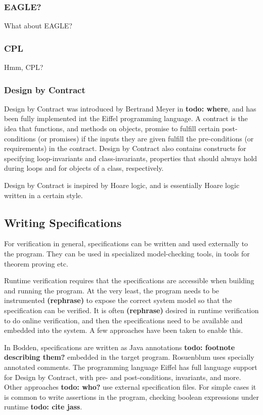 \documentclass[a4paper,11pt]{kth-mag}
\newcommand{\todo}[1]{\textbf{todo: #1}}
\newcommand{\rephrase}{\textbf{(rephrase)} }
\begin{document}
\subsubsection{EAGLE?}

What about EAGLE?

\subsubsection{CPL}

Hmm, CPL?



\subsubsection{Design by Contract}

Design by Contract was introduced by Bertrand Meyer in \todo{where}, and has
been fully implemented int the Eiffel programming language. A contract is the
idea that functions, and methods on objects, promise to fulfill certain
post-conditions (or promises) if the inputs they are given fulfill the
pre-conditions (or requirements) in the contract. Design by Contract also
contains constructs for specifying loop-invariants and class-invariants,
properties that should always hold during loops and for objects of a class,
respectively.

Design by Contract is inspired by Hoare logic, and is essentially Hoare logic
written in a certain style.

\subsection{Writing Specifications}

For verification in general, specifications can be written and used externally
to the program. They can be used in specialized model-checking tools, in tools
for theorem proving etc.

Runtime verification requires that the specifications are accessible when
building and running the program. At the very least, the program needs to be
instrumented \rephrase to expose the correct system model so that the
specification can be verified. It is often \rephrase desired in runtime
verification to do online verification, and then the specifications need to be
available and embedded into the system. A few approaches have been taken to
enable this.

In Bodden, specifications are written as Java annotations \todo{footnote
describing them?} embedded in the target program. Rosuenblum
\cite{rosenblum95practicalassertions} uses specially annotated comments. The
programming language Eiffel has full language support for Design by Contract,
with pre- and post-conditions, invariants, and more. Other approaches
\todo{who?} use external specification files. For simple cases it is common to
write assertions in the program, checking boolean expressions under runtime
\todo{cite jass}.
\end{document}
